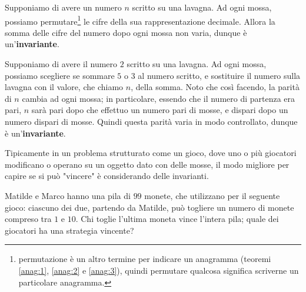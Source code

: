 \documentclass[11pt]{scrartcl}
\begin{document}
	\begin{example}
		Supponiamo di avere un numero $n$ scritto su una lavagna. Ad ogni mossa, possiamo permutare\footnote{permutazione è un altro termine per indicare un anagramma (teoremi \ref{anag:1}, \ref{anag:2} e \ref{anag:3}), quindi permutare qualcosa significa scriverne un particolare anagramma.} le cifre della sua rappresentazione decimale. Allora la somma delle cifre del numero dopo ogni mossa non varia, dunque è un'\textbf{invariante}.
	\end{example}
	\begin{example}
		Supponiamo di avere il numero $2$ scritto su una lavagna. Ad ogni mossa, possiamo scegliere se sommare $5$ o $3$ al numero scritto, e sostituire il numero sulla lavagna con il valore, che chiamo $n$,  della somma. Noto che così facendo, la parità di $n$ cambia ad ogni mossa; in particolare, essendo che il numero di partenza era pari, $n$ sarà pari dopo che effettuo un numero pari di mosse, e dispari dopo un numero dispari di mosse. Quindi questa parità varia in modo controllato, dunque è un'\textbf{invariante}.
	\end{example}
	Tipicamente in un problema strutturato come un gioco, dove uno o più giocatori modificano o operano su un oggetto dato con delle mosse, il modo migliore per capire se si può "vincere" è considerando delle invarianti.
	\begin{exercise}
		Matilde e Marco hanno una pila di $99$ monete, che utilizzano per il seguente gioco: ciascuno dei due, partendo da Matilde, può togliere un numero di monete compreso tra $1$ e $10$. Chi toglie l'ultima moneta vince l'intera pila; quale dei giocatori ha una strategia vincente?
	\end{exercise}
\end{document}
